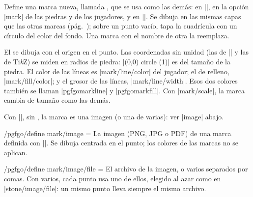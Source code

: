 \label{subsec:marcaspropias}\begin{command}{\pgfgodefinemark{}}
	Define una marca nueva, llamada , que se usa como las demás: en |\marks|, en la opción |mark| de las piedras y de los jugadores, y en |\territory|. Se dibuja en las mismas capas que las otras marcas (pág.~\pageref{subsec:capas}); sobre un punto vacío, tapa la cuadrícula con un círculo del color del fondo. Una marca con el nombre de otra la reemplaza.

	El  se dibuja con el origen en el punto. Las coordenadas sin unidad (las de |\pgfpointxy| y las de Ti\emph{k}Z) se miden en radios de piedra: |(0,0) circle (1)| es del tamaño de la piedra. El color de las líneas es |mark/line/color| del jugador; el de relleno, |mark/fill/color|; y el grosor de las líneas, |mark/line/width|. Esos dos colores también se llaman |pgfgomarkline| y |pgfgomarkfill|. Con |mark/scale|, la marca cambia de tamaño como las demás.

	Con |\pgfgodefinemark[image = {file = |\meta{file list}|, width = |\meta{dimension}|}]|, sin , la marca es una imagen (o una de varias): ver |image| abajo.

	\begin{codeexample}[]

		\begin{goban}[5, partial = B2:D4]
		\end{goban}
	\end{codeexample}
\end{command}

\begin{key}{/pgfgo/define mark/image = }
	La imagen (PNG, JPG o PDF) de una marca definida con |\pgfgodefinemark|. Se dibuja centrada en el punto; los colores de las marcas no se aplican.
\end{key}

\begin{key}{/pgfgo/define mark/image/file = }
	El archivo de la imagen, o varios separados por comas. Con varios, cada punto usa uno de ellos, elegido al azar como en |stone/image/file|: un mismo punto lleva siempre el mismo archivo.

	\begin{codeexample}[]

		\begin{goban}[5, partial = A1:E3]
		\end{goban}
	\end{codeexample}
\end{key}

